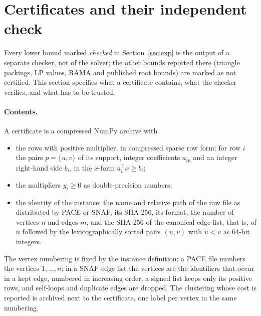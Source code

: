 \section{Certificates and their independent check}\label{sec:cert}

Every lower bound marked \emph{checked} in Section~\ref{sec:exp} is the
output of a separate checker, not of the solver; the other bounds reported
there (triangle packings, LP values, RAMA and published root bounds) are
marked as not certified.  This section specifies what a
certificate contains, what the checker verifies, and what has to be trusted.

\paragraph{Contents.}  A certificate is a compressed NumPy archive with
\begin{itemize}
\item the rows with positive multiplier, in compressed sparse row form: for
row $i$ the pairs $p=\{u,v\}$ of its support, integer coefficients $a_{ip}$
and an integer right-hand side $b_i$, in the $x$-form $a_i^\top x\ge b_i$;
\item the multipliers $y_i\ge0$ as double-precision numbers;
\item the identity of the instance: the name and relative path of the raw file
as distributed by PACE or SNAP, its SHA-256, its format, the number of
vertices $n$ and edges $m$, and the SHA-256 of the canonical edge list, that
is, of $n$ followed by the lexicographically sorted pairs $(u,v)$ with $u<v$
as 64-bit integers.
\end{itemize}
The vertex numbering is fixed by the instance definition: a PACE file numbers
the vertices $1,\dots,n$; in a SNAP edge list the vertices are the identifiers
that occur in a kept edge, numbered in increasing order, a signed list keeps
only its positive rows, and self-loops and duplicate edges are dropped.  The
clustering whose cost is reported is archived next to the certificate, one
label per vertex in the same numbering.

